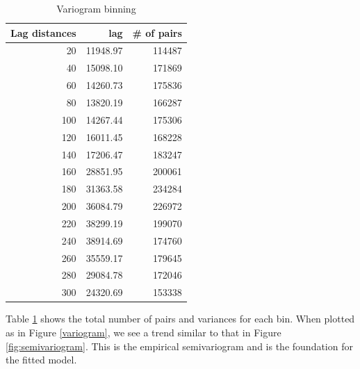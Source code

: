 \documentclass[12pt,twoside]{reedthesis}
\begin{document}
\begin{table}[h]

\centering

\begin{tabular}{r|r|r}
\hline
Lag distances & lag & \# of pairs\\
\hline
20 & 11948.97 & 114487\\
\hline
40 & 15098.10 & 171869\\
\hline
60 & 14260.73 & 175836\\
\hline
80 & 13820.19 & 166287\\
\hline
100 & 14267.44 & 175306\\
\hline
120 & 16011.45 & 168228\\
\hline
140 & 17206.47 & 183247\\
\hline
160 & 28851.95 & 200061\\
\hline
180 & 31363.58 & 234284\\
\hline
200 & 36084.79 & 226972\\
\hline
220 & 38299.19 & 199070\\
\hline
240 & 38914.69 & 174760\\
\hline
260 & 35559.17 & 179645\\
\hline
280 & 29084.78 & 172046\\
\hline
300 & 24320.69 & 153338\\
\hline
\end{tabular}

\caption{Variogram binning}
\label{bins}

\end{table}

Table \ref{bins} shows the total number of pairs and variances for each bin. When plotted as in Figure \ref{variogram}, we see a trend similar to that in Figure \ref{fig:semivariogram}. This is the empirical semivariogram and is the foundation for the fitted model.
	
\end{document}
